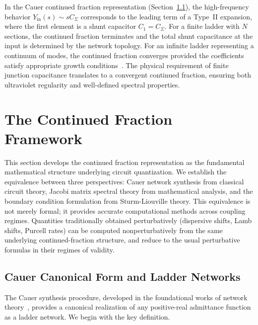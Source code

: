 \documentclass[reprint, floatfix, superscriptaddress, amsmath, amssymb, longbibliography]{revtex4-2}
\begin{document}
In the Cauer continued fraction representation (Section~\ref{sec:cauer_synthesis}), the high-frequency behavior $Y_{\mathrm{in}}(s) \sim sC_\Sigma$ corresponds to the leading term of a Type~II expansion, where the first element is a shunt capacitor $C_1 = C_\Sigma$. For a finite ladder with $N$ sections, the continued fraction terminates and the total shunt capacitance at the input is determined by the network topology. For an infinite ladder representing a continuum of modes, the continued fraction converges provided the coefficients satisfy appropriate growth conditions~\cite{Wall1948}. The physical requirement of finite junction capacitance translates to a convergent continued fraction, ensuring both ultraviolet regularity and well-defined spectral properties.


\section{The Continued Fraction Framework}
\label{sec:cf_framework}

This section develops the continued fraction representation as the fundamental mathematical structure underlying circuit quantization. We establish the equivalence between three perspectives: Cauer network synthesis from classical circuit theory, Jacobi matrix spectral theory from mathematical analysis, and the boundary condition formulation from Sturm-Liouville theory. This equivalence is not merely formal; it provides accurate computational methods across coupling regimes. Quantities traditionally obtained perturbatively (dispersive shifts, Lamb shifts, Purcell rates) can be computed nonperturbatively from the same underlying continued-fraction structure, and reduce to the usual perturbative formulas in their regimes of validity.

\subsection{Cauer Canonical Form and Ladder Networks}
\label{sec:cauer_synthesis}

The Cauer synthesis procedure, developed in the foundational works of network theory~\cite{Cauer1926, Cauer1958, Guillemin1957}, provides a canonical realization of any positive-real admittance function as a ladder network. We begin with the key definition.
\end{document}
